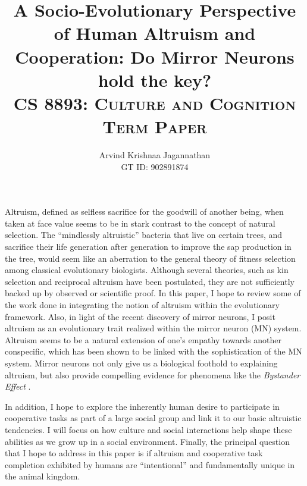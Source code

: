 \documentclass[12pt, letter]{article}
\newcommand{\doctitle}{%
A Socio-Evolutionary Perspective of Human Altruism and Cooperation: Do Mirror Neurons hold the key?}
\begin{document}
\title{\textbf{\doctitle}\\
\textsc{CS 8893: Culture and Cognition\\ Term Paper}
}
  \author {Arvind Krishnaa Jagannathan \\ GT ID: 902891874}
  \date{}
\maketitle
Altruism, defined as selfless sacrifice for the goodwill of another being, when taken at face value seems to be in stark contrast to the concept of natural selection. The ``mindlessly altruistic'' bacteria \cite{warneken2009roots} that live on certain trees, and sacrifice their life generation after generation to improve the sap production in the tree, would seem like an aberration to the general theory of fitness selection among classical evolutionary biologists. Although several theories, such as kin selection and reciprocal altruism have been postulated, they are not sufficiently backed up by observed or scientific proof. In this paper, I hope to review some of the work done in integrating the notion of altruism within the evolutionary framework. Also, in light of the recent discovery of mirror neurons, I posit altruism as an evolutionary trait realized within the mirror neuron (MN) system. Altruism seems to be a natural extension of one's empathy towards another conspecific, which has been shown \cite{decety2006social} to be linked with the sophistication of the MN system. Mirror neurons not only give us a biological foothold to explaining altruism, but also provide compelling evidence for phenomena like the \emph{Bystander Effect} \cite{gansberg196438}. 

In addition, I hope to explore the inherently human desire to participate in cooperative tasks as part of a large social group and link it to our basic altruistic tendencies. I will focus on how culture and social interactions help shape these abilities as we grow up in a social environment. Finally, the principal question that I hope to address in this paper is if altruism and cooperative task completion exhibited by humans are ``intentional'' and fundamentally unique in the animal kingdom.
\end{document}
